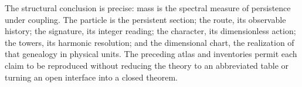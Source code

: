 The structural conclusion is precise: mass is the spectral measure of persistence under coupling. The particle is the persistent section; the route, its observable history; the signature, its integer reading; the character, its dimensionless action; the towers, its harmonic resolution; and the dimensional chart, the realization of that genealogy in physical units. The preceding atlas and inventories permit each claim to be reproduced without reducing the theory to an abbreviated table or turning an open interface into a closed theorem.
